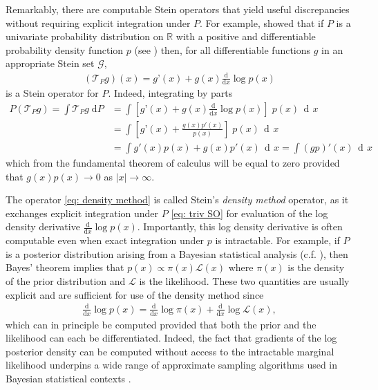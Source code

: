 \documentclass[12pt,paper=letter]{scrreprt}
\newcommand{\dee}{\mathop{\mathrm{d}\!}}
\newcommand{\dx}{\,\dee x}
\def\R{\mathbb{R}}
\newcommand{\gset}[0]{\mathcal{G}} %
\newcommand{\TP}{\mathcal{T}_P}
\begin{document}
Remarkably, there are computable Stein operators that yield useful discrepancies without requiring explicit integration under $P$.  %
For example, \citet{stein1986approximate} showed that if $P$ is a univariate probability distribution on $\R$ with a positive and differentiable probability density function $p$ (see ) then, for all differentiable functions $g$ in an appropriate Stein set $\gset$, 
\begin{align}
(\TP g)(x) = g’(x) + g(x) \frac{\mathrm{d}}{\mathrm{d}x} \log p(x)     \label{eq: density method}
\end{align}
is a Stein operator for $P$.
Indeed, integrating by parts
\begin{align}
    P(\TP g) = \int \TP g \; \mathrm{d}P & = \int \left[ g’(x) + g(x) \frac{\mathrm{d}}{\mathrm{d}x} \log p(x)  \right] \; p(x) \dx \nonumber \\
    & = \int \left[ g’(x) + \frac{g(x)p'(x)}{p(x)}  \right] \; p(x) \dx \label{eq: uni int by parts} \\
    & = \int g'(x) p(x) + g(x) p'(x) \dx 
    = \int (gp)'(x) \dx \nonumber
\end{align}
which from the fundamental theorem of calculus will be equal to zero provided that $g(x) p(x) \rightarrow 0$ as $|x| \rightarrow \infty$.

The operator \cref{eq: density method} is called Stein's \emph{density method} operator, as it exchanges explicit integration under $P$ \cref{eq: triv SO} for evaluation of the log density derivative $\frac{\mathrm{d}}{\mathrm{d}x} \log p(x)$. 
Importantly, this log density derivative is often computable even when exact integration under $p$ is intractable. 
For example, if $P$ is a posterior distribution arising from a Bayesian statistical analysis (c.f. ), then Bayes' theorem implies that $p(x) \propto \pi(x) \mathcal{L}(x)$ where $\pi(x)$ is the density of the prior distribution and $\mathcal{L}$ is the likelihood.
These two quantities are usually explicit and are sufficient for use of the density method since
\begin{align*}
    \frac{\mathrm{d}}{\mathrm{d}x} \log p(x) = \frac{\mathrm{d}}{\mathrm{d}x} \log \pi(x) + \frac{\mathrm{d}}{\mathrm{d}x} \log \mathcal{L}(x) ,
\end{align*}
which can in principle be computed provided that both the prior and the likelihood can each be differentiated.
Indeed, the fact that gradients of the log posterior density can be computed without access to the intractable marginal likelihood underpins a wide range of approximate sampling algorithms used in Bayesian statistical contexts \citep{brooks2011handbook}.
\end{document}
